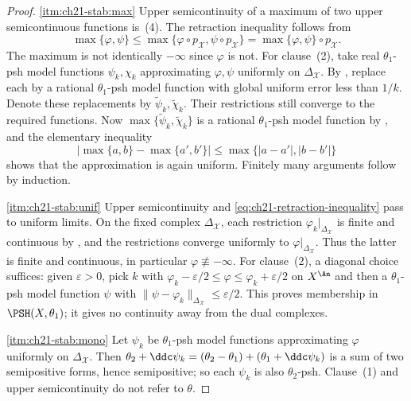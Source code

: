 \begin{proof}
\cref{itm:ch21-stab:max}  Upper semicontinuity of a maximum of two upper
semicontinuous functions is
\,(4).  The retraction inequality follows from
\[
 \max\{\varphi,\psi\}
 \leq\max\{\varphi\circ p_{\mathcal X},\psi\circ p_{\mathcal X}\}
 =\max\{\varphi,\psi\}\circ p_{\mathcal X}.
\]
The maximum is not identically $-\infty$ since $\varphi$ is not.  For
clause~(2), take real $\theta_1$-psh model functions
$\psi_k,\chi_k$ approximating $\varphi,\psi$ uniformly on
$\Delta_{\mathcal X}$.  By
, replace each by a
rational $\theta_1$-psh model function with global uniform error less
than $1/k$.  Denote these replacements by
$\widetilde\psi_k,\widetilde\chi_k$.  Their restrictions still converge
to the required functions.  Now
$\max\{\widetilde\psi_k,\widetilde\chi_k\}$ is a rational
$\theta_1$-psh model function by , and the
elementary inequality
\[
 \bigl|\max\{a,b\}-\max\{a',b'\}\bigr|
 \leq\max\{|a-a'|,|b-b'|\}
\]
shows that the approximation is again uniform.  Finitely many arguments
follow by induction.

\cref{itm:ch21-stab:unif}  Upper semicontinuity and
\eqref{eq:ch21-retraction-inequality} pass to uniform limits.  On the fixed
complex $\Delta_{\mathcal X}$, each restriction
$\varphi_k|_{\Delta_{\mathcal X}}$ is finite and continuous by
, and the restrictions converge uniformly
to $\varphi|_{\Delta_{\mathcal X}}$.  Thus the latter is finite and
continuous, in particular $\varphi\not\equiv-\infty$.  For clause~(2), a
diagonal choice suffices: given $\varepsilon>0$, pick $k$ with
$\varphi_k-\varepsilon/2\leq\varphi\leq\varphi_k+\varepsilon/2$
on $X^{\An}$ and then a
$\theta_1$-psh model function $\psi$ with
$\lVert\psi-\varphi_k\rVert_{\Delta_{\mathcal X}}\leq\varepsilon/2$.
This proves membership in $\PSH(X,\theta_1)$; it gives no continuity away
from the dual complexes.

\cref{itm:ch21-stab:mono}  Let $\psi_k$ be $\theta_1$-psh model functions
approximating $\varphi$ uniformly on $\Delta_{\mathcal X}$.  Then
$\theta_2+\ddc\psi_k=(\theta_2-\theta_1)+(\theta_1+\ddc\psi_k)$ is a sum
of two semipositive forms, hence semipositive; so each $\psi_k$ is also
$\theta_2$-psh.  Clause~(1) and upper semicontinuity do not refer to
$\theta$.
\end{proof}

